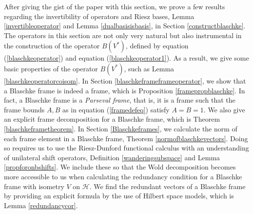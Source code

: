 \documentclass[10pt, reqno]{amsart}
\theoremstyle{definition}
\numberwithin{equation}{section}
\begin{document}
After giving the gist of the paper with this section, we prove a few results regarding the invertibility of operators and Riesz bases, Lemma \ref{invertibleoperator} and Lemma \ref{dualbasisisbasis}, in Section \ref{constructblaschke}. The operators in this section are not only very natural but also instrumental in the construction of the operator $B(V^{*})$, defined by equation (\ref{blaschkeoperator}) and equation (\ref{blaschkeoperator1}). As a result, we give some basic properties of the operator $B(V^{*})$, such as Lemma \ref{blaschkeoperatorcoisom}. In Section \ref{blaschkeframeframeoperator}, we show that a Blaschke frame is indeed a frame, which is Proposition \ref{framepropblaschke}. In fact, a Blaschke frame is a {\it{Parseval frame}}, that is, it is a frame such that the frame bounds $A,B$ as in equation (\ref{framedefeq}) satisfy $A=B=1$. We also give an explicit frame decomposition for a Blaschke frame, which is Theorem \ref{blaschkeframetheorem}. In Section \ref{Blaschkeframes}, we calculate the norm of each frame element in a Blaschke frame, Theorem \ref{normofblaschkevectors}. Doing so requires us to use the Riesz-Dunford functional calculus with an understanding of unilateral shift operators, Definition \ref{wanderingsubspace} and Lemma \ref{propforonbshifts}. We include these so that the Wold decomposition becomes more accessible to us when calculating the redundancy condition for a Blaschke frame with isometry $V$ on $\mathcal{H}$. We find the redundant vectors of a Blaschke frame by providing an explicit formula by the use of Hilbert space models, which is Lemma \ref{redundancycor}. 

    
    
\end{document}
